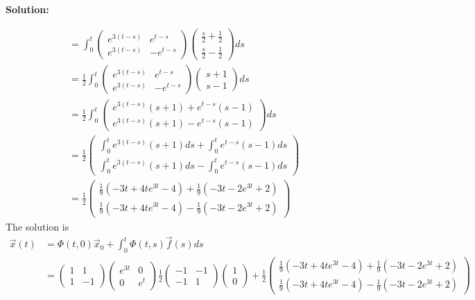 \documentclass[12pt]{article}
\newenvironment{solution}{
    \textbf{Solution:}
    
}{
    
    \vspace{2em}
}
\begin{document}
\begin{solution}
\[\begin{aligned}
            &= \int_0^t \begin{pmatrix} e^{3(t-s)} & e^{t-s} \\ e^{3(t-s)} & -e^{t-s} \end{pmatrix} \begin{pmatrix} \frac{s}{2} + \frac{1}{2} \\ \frac{s}{2} - \frac{1}{2} \end{pmatrix} ds \\
            &= \frac{1}{2} \int_{0}^{t} \begin{pmatrix} e^{3(t-s)} & e^{t-s} \\ e^{3(t-s)} & -e^{t-s} \end{pmatrix} \begin{pmatrix} s + 1 \\ s - 1 \end{pmatrix} ds \\
            &= \frac{1}{2} \int_{0}^{t} \begin{pmatrix} e^{3(t-s)}(s + 1) + e^{t-s}(s - 1) \\ e^{3(t-s)}(s + 1) - e^{t-s}(s - 1) \end{pmatrix} ds \\
            &= \frac{1}{2} \begin{pmatrix} \int_{0}^{t} e^{3(t-s)}(s + 1) ds + \int_{0}^{t} e^{t-s}(s - 1) ds \\ \int_{0}^{t} e^{3(t-s)}(s + 1) ds - \int_{0}^{t} e^{t-s}(s - 1) ds \end{pmatrix}\\
            &= \frac{1}{2} \begin{pmatrix} \frac{1}{9}(-3t + 4te^{3t} - 4) + \frac{1}{9}(-3t -2e^{3t}+2) \\ \frac{1}{9}(-3t + 4te^{3t} - 4) - \frac{1}{9}(-3t -2e^{3t}+2) \end{pmatrix}
        \end{aligned}
    \]
    The solution is
    \[
        \begin{aligned}
            \vec{x}(t) &= \Phi(t,0) \vec{x}_0 + \int_0^t \Phi(t,s) \vec{f}(s) ds\\
            &= \begin{pmatrix} 1 & 1 \\ 1 & -1 \end{pmatrix} \begin{pmatrix} e^{3t} & 0 \\ 0 & e^{t} \end{pmatrix} \frac{1}{2}\begin{pmatrix} -1 & -1 \\ -1 & 1 \end{pmatrix} \begin{pmatrix} 1 \\ 0 \end{pmatrix} + \frac{1}{2} \begin{pmatrix} \frac{1}{9}(-3t + 4te^{3t} - 4) + \frac{1}{9}(-3t -2e^{3t}+2) \\ \frac{1}{9}(-3t + 4te^{3t} - 4) - \frac{1}{9}(-3t -2e^{3t}+2) \end{pmatrix} \\
        \end{aligned}
    \]


\end{solution}
\end{document}
